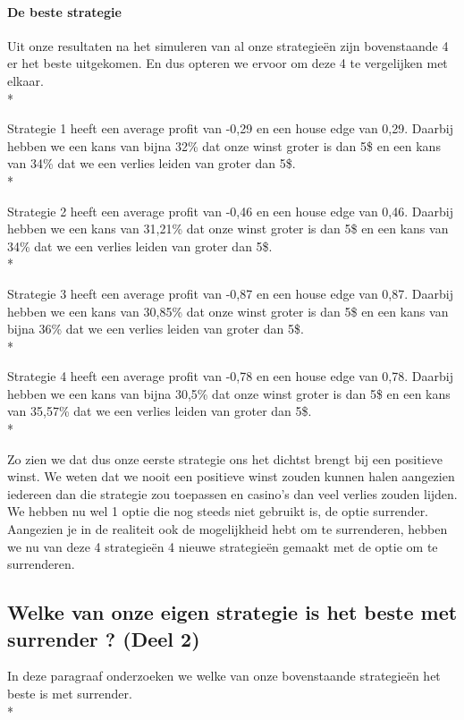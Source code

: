 \documentclass[conference]{IEEEtran}
\begin{document}
\paragraph{De beste strategie}

Uit onze resultaten na het simuleren van al onze strategie\"en zijn bovenstaande 4 er het beste uitgekomen. En dus opteren we ervoor om deze 4 te vergelijken met elkaar. \\*

Strategie 1 heeft een average profit van -0,29 en een house edge van 0,29. Daarbij hebben we een kans van bijna 32\% dat onze winst groter is dan 5\$ en een kans van 34\% dat we een verlies leiden van groter dan 5\$. \\*

Strategie 2 heeft een average profit van -0,46 en een house edge van 0,46. Daarbij hebben we een kans van 31,21\% dat onze winst groter is dan 5\$ en een kans van 34\% dat we een verlies leiden van groter dan 5\$.\\*

Strategie 3 heeft een average profit van -0,87 en een house edge van 0,87. Daarbij hebben we een kans van 30,85\% dat onze winst groter is dan 5\$ en een kans van bijna 36\% dat we een verlies leiden van groter dan 5\$.\\*

Strategie 4 heeft een average profit van -0,78 en een house edge van 0,78. Daarbij hebben we een kans van bijna 30,5\% dat onze winst groter is dan 5\$ en een kans van 35,57\% dat we een verlies leiden van groter dan 5\$. \\*
 
Zo zien we dat dus onze eerste strategie ons het dichtst brengt bij een positieve winst. We weten dat we nooit een positieve winst zouden kunnen halen aangezien iedereen dan die strategie zou toepassen en casino's dan veel verlies zouden lijden.
We hebben nu wel 1 optie die nog steeds niet gebruikt is, de optie surrender. Aangezien je in de realiteit ook de mogelijkheid hebt om te surrenderen, hebben we nu van deze 4 strategie\"en 4 nieuwe strategie\"en gemaakt met de optie om te surrenderen. 
 
 
\newpage

\subsection{Welke van onze eigen strategie is het beste met surrender ? (Deel 2)}
In deze paragraaf onderzoeken we welke van onze bovenstaande strategie\"en het beste is met surrender.\\*
\end{document}
